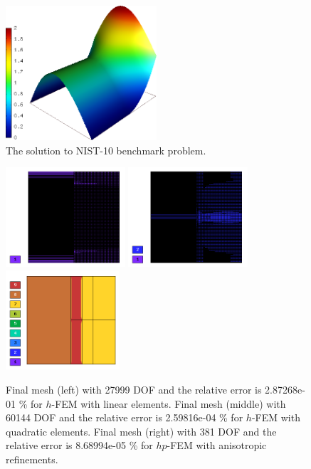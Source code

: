 \documentclass[12pt]{elsarticle}
\begin{document}
\begin{figure}[H]
\centering
\includegraphics[height=5cm]{nist/nist-10/solution.png}
\caption{The solution to NIST-10 benchmark problem.}
\label{fig:sln-nist10}
\end{figure}

\begin{figure}[H]
\centering
\includegraphics[height=3.7cm]{nist/nist-10/mesh_h1_aniso.png}
\includegraphics[height=3.7cm]{nist/nist-10/mesh_h2_aniso.png}
\includegraphics[height=3.7cm]{nist/nist-10/mesh_hp_aniso.png}
\caption{
Final mesh (left) with 27999 DOF and the relative error is 2.87268e-01 \% for $h$-FEM with linear elements.
Final mesh (middle) with 60144 DOF and the relative error is 2.59816e-04 \% for $h$-FEM with quadratic elements.
Final mesh (right) with 381 DOF and the relative error is 8.68994e-05 \% for $hp$-FEM with anisotropic refinements.}
\label{fig:nist-10-hp-aniso}
\end{figure}
\end{document}
